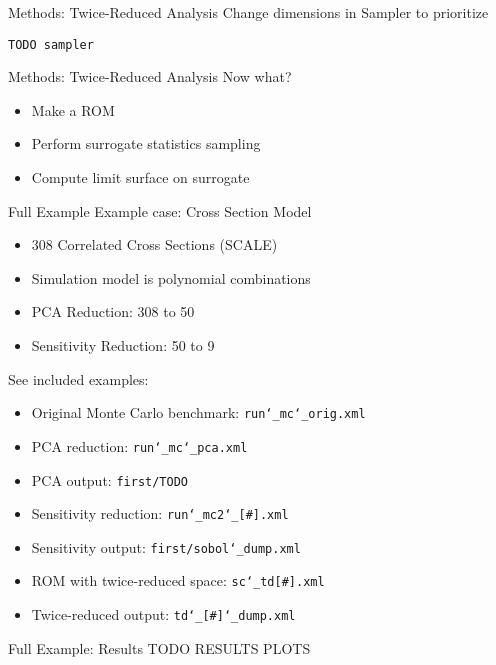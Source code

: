 \documentclass[t,9pt,svgnames]{beamer}
\newenvironment{codebox}{}{}
\newcommand{\code}[1]{\texttt{#1}}
\begin{document}
\begin{frame}[fragile]{Methods: Twice-Reduced Analysis}
  Change dimensions in Sampler to prioritize
  \begin{codebox}
    \begin{lstlisting}[emph={indices}]
      TODO sampler
    \end{lstlisting}
  \end{codebox}
\end{frame}

\begin{frame}[fragile]{Methods: Twice-Reduced Analysis}
  Now what?
  \begin{itemize}
    \item Make a ROM
    \item Perform surrogate statistics sampling
    \item Compute limit surface on surrogate
  \end{itemize}
\end{frame}

\begin{frame}[fragile]{Full Example}
  Example case: Cross Section Model
  \begin{itemize}
    \item 308 Correlated Cross Sections (SCALE)
    \item Simulation model is polynomial combinations
    \item PCA Reduction: 308 to 50
    \item Sensitivity Reduction: 50 to 9
  \end{itemize}
  See included examples:
  \begin{itemize}
    \item Original Monte Carlo benchmark: \code{run\char`_mc\char`_orig.xml}
    \item PCA reduction: \code{run\char`_mc\char`_pca.xml}
    \item PCA output: \code{first/TODO}
    \item Sensitivity reduction: \code{run\char`_mc2\char`_[\#].xml}
    \item Sensitivity output: \code{first/sobol\char`_dump.xml}
    \item ROM with twice-reduced space: \code{sc\char`_td[\#].xml}
    \item Twice-reduced output: \code{td\char`_[\#]\char`_dump.xml}
  \end{itemize}
\end{frame}

\begin{frame}[fragile]{Full Example: Results}
  TODO RESULTS PLOTS
\end{frame}
\end{document}
